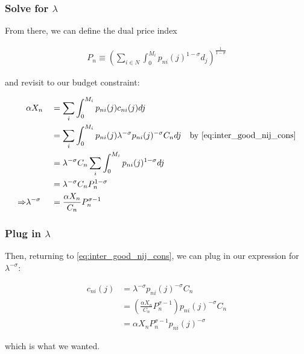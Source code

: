 \documentclass[10pt]{article}
\begin{document}
\subsubsection{Solve for $\lambda$}

From there, we can define the dual price index 

\begin{align}
    P_n \equiv \left(\sum_{i \in N} \int_0^{M_i} p_{n i}(j)^{1-\sigma} d_j \right)^{\frac{1}{1-\sigma}}
\end{align}

and revisit to our budget constraint:

\begin{alignat}{2}
    &\alpha X_n && = \sum_i \int_{0}^{M_i} p_{n i}(j) c_{n i}(j) d j \\
    &&&= \sum_i \int_{0}^{M_i} p_{n i}(j) \lambda^{-\sigma} p_{ni}(j)^{-\sigma} C_n d j \quad \text{by \eqref{eq:inter_good_nij_cons}} \\
    &&&= \lambda^{-\sigma} C_n \sum_i \int_{0}^{M_i} p_{n i}(j)^{1-\sigma} d j \\
    &&& = \lambda^{-\sigma} C_n P_n^{1-\sigma} \\
    \Rightarrow &\lambda^{-\sigma} &&= \frac{\alpha X_n}{C_n} P_n^{\sigma-1} \\
\end{alignat}

\subsubsection{Plug in $\lambda$}

Then, returning to \eqref{eq:inter_good_nij_cons}, we can plug in our expression for $\lambda^{-\sigma}$:

\begin{align}
    c_{n i}(j) &= \lambda^{-\sigma} p_{ni}(j)^{-\sigma} C_n \\
    &= \left(\frac{\alpha X_n}{C_n} P_n^{\sigma-1}\right) p_{ni}(j)^{-\sigma} C_n \\
    &= \alpha X_n P_n^{\sigma-1} p_{ni}(j)^{-\sigma}
\end{align}

which is what we wanted.
\end{document}
